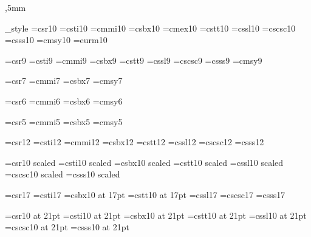 \hsize=130mm \hoffset=12mm
\vsize=528pt ,5mm
\parindent=6mm


\def\macro#1{\csname#1\endcsname}
\def\defMacro#1{\expandafter\def\csname#1\endcsname}
\def\xdef_macro#1{\expandafter\xdef\csname#1\endcsname}
\def\incr#1{\advance#1 by 1}
\def\decr#1{\advance#1 by -1}

\def\handle_option#1{%
    \toks0={\macro{#1}}%
    \futurelet\text\is_option}
\def\is_option{%
    \def\pris{\the\toks0}%
    \ifx\text[\def\text{}%
    \else \def\text{[]}\fi
    \expandafter\pris\text}

\newtoks\font_style         %
\font\tenrm=csr10          %
\font\tenit=csti10
\font\teni=cmmi10
\font\tenbf=csbx10
\font\tenex=cmex10
\font\tentt=cstt10
\font\tensl=cssl10
\font\tensc=cscsc10
\font\tenss=csss10
\font\tensy=cmsy10
\font\teneu=eurm10

\font\ninerm=csr9          %
\font\nineit=csti9
\font\ninei=cmmi9
\font\ninebf=csbx9
\font\ninett=cstt9
\font\ninesl=cssl9
\font\ninesc=cscsc9
\font\niness=csss9
\font\ninesy=cmsy9

\font\sevenrm=csr7          %
\font\seveni=cmmi7
\font\sevenbf=csbx7
\font\sevensy=cmsy7

\font\sixrm=csr6          %
\font\sixi=cmmi6
\font\sixbf=csbx6
\font\sixsy=cmsy6

\font\fiverm=csr5          %
\font\fivei=cmmi5
\font\fivebf=csbx5
\font\fivesy=cmsy5

\font\twelverm=csr12       %
\font\twelveit=csti12
\font\twelveit=cmmi12
\font\twelvebf=csbx12
\font\twelvett=cstt12
\font\twelvesl=cssl12
\font\twelvesc=cscsc12
\font\twelvess=csss12

\font\fourteenrm=csr10 scaled         %
\font\fourteenit=csti10 scaled 
\font\fourteenbf=csbx10 scaled 
\font\fourteentt=cstt10 scaled 
\font\fourteensl=cssl10 scaled 
\font\fourteensc=cscsc10 scaled 
\font\fourteenss=csss10 scaled 

\font\seventeenrm=csr17    %
\font\seventeenit=csti17
\font\seventeenbf=csbx10 at 17pt
\font\seventeentt=cstt10 at 17pt
\font\seventeensl=cssl17
\font\seventeensc=cscsc17
\font\seventeenss=csss17

\font\twentyonerm=csr10 at 21pt    %
\font\twentyoneit=csti10 at 21pt
\font\twentyonebf=csbx10 at 21pt
\font\twentyonett=cstt10 at 21pt
\font\twentyonesl=cssl10 at 21pt
\font\twentyonesc=cscsc10 at 21pt
\font\twentyoness=csss10 at 21pt

